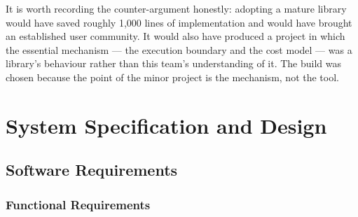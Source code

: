\documentclass[12pt,a4paper,oneside]{report}
\begin{document}
It is worth recording the counter-argument honestly: adopting a mature library
would have saved roughly 1{,}000 lines of implementation and would have brought
an established user community. It would also have produced a project in which the
essential mechanism --- the execution boundary and the cost model --- was a
library's behaviour rather than this team's understanding of it. The build was
chosen because the point of the minor project is the mechanism, not the tool.

\chapter{System Specification and Design}

\section{Software Requirements}

\subsection{Functional Requirements}
\end{document}
